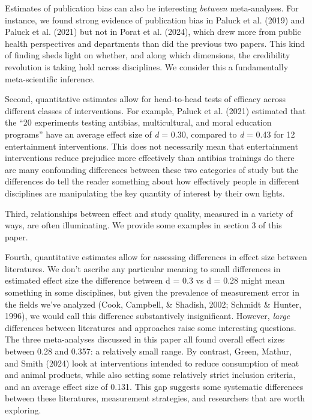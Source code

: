 \documentclass[
  ,jou]{apa6}
\begin{document}
Estimates of publication bias can also be interesting \emph{between} meta-analyses. For instance, we found strong evidence of publication bias in Paluck et al. (2019) and Paluck et al. (2021) but not in Porat et al. (2024), which drew more from public health perspectives and departments than did the previous two papers. This kind of finding sheds light on whether, and along which dimensions, the credibility revolution is taking hold across disciplines. We consider this a fundamentally meta-scientific inference.

Second, quantitative estimates allow for head-to-head tests of efficacy across different classes of interventions. For example, Paluck et al. (2021) estimated that the ``20 experiments testing antibias, multicultural, and moral education programs'' have an average effect size of \emph{d} = 0.30, compared to \emph{d} = 0.43 for 12 entertainment interventions. This does not necessarily mean that entertainment interventions reduce prejudice more effectively than antibias trainings do \textemdash there are many confounding differences between these two categories of study \textemdash but the differences do tell the reader something about how effectively people in different disciplines are manipulating the key quantity of interest by their own lights.

Third, relationships between effect and study quality, measured in a variety of ways, are often illuminating. We provide some examples in section 3 of this paper.

Fourth, quantitative estimates allow for assessing differences in effect size between literatures. We don't ascribe any particular meaning to small differences in estimated effect size \textemdash the difference between d = 0.3 vs d = 0.28 might mean something in some disciplines, but given the prevalence of measurement error in the fields we've analyzed (Cook, Campbell, \& Shadish, 2002; Schmidt \& Hunter, 1996), we would call this difference substantively insignificant. However, \emph{large} differences between literatures and approaches raise some interesting questions. The three meta-analyses discussed in this paper all found overall effect sizes between 0.28 and 0.357: a relatively small range. By contrast, Green, Mathur, and Smith (2024) look at interventions intended to reduce consumption of meat and animal products, while also setting some relatively strict inclusion criteria, and an average effect size of 0.131. This gap suggests some systematic differences between these literatures, measurement strategies, and researchers that are worth exploring.
\end{document}
